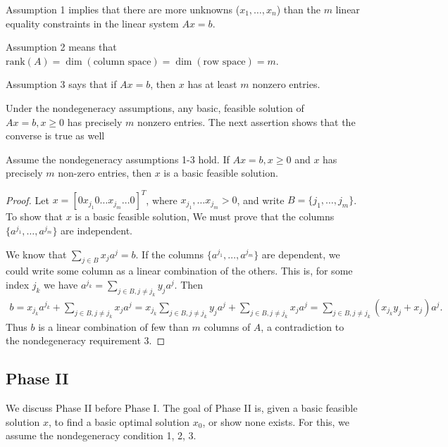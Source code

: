 Assumption 1 implies that there are more unknowns ($x_1, \dots , x_n$) than the $m$ linear equality constraints in the linear system $Ax = b$.

Assumption 2 means that $\mathrm{rank}(A) = \dim (\text{column space}) = \dim (\text{row space}) = m$.

Assumption 3 says that if $Ax = b$, then $x$ has at least $m$ nonzero entries.

\begin{remark}
Under the nondegeneracy assumptions, any basic, feasible solution of $Ax = b, x \ge 0$ has precisely $m$ nonzero entries.
The next assertion shows that the converse is true as well
\end{remark}

\begin{lemma}[On nondegeneracy]
Assume the nondegeneracy assumptions 1-3 hold.
If $Ax = b, x \ge 0$ and $x$ has precisely $m$ non-zero entries, then $x$ is a basic feasible solution.
\end{lemma}

\begin{proof}
Let $x = [0 x_{j_1} 0 \dots x_{j_m} \dots 0]^T$, where $x_{j_1}, \dots x_{j_m} > 0$, and write $B = \{ j_1, \dots, j_m \}$.
To show that $x$ is a basic feasible solution, We must prove that the columns $\{ a^{j_1}, \dots, a^{j_m} \}$ are independent. 

We know that $\sum _{j \in B} x_j a^j = b$.
If the columns $\{ a^{j_1}, \dots, a^{j_m} \}$ are dependent, we could write some column as a linear combination of the others.
This is, for some index $j_k$ we have $a^{j_k} = \sum _ {j \in B, j \neq j_k} y_j a^j$.
Then 
\begin{align}
b = x_{j_k} a^{j_k} + \sum _ {j \in B, j \neq j_k} x_j a^j 
= x_{j_k} \sum _ {j \in B, j \neq j_k} y_j a^j + \sum _ {j \in B, j \neq j_k} x_j a^j 
= \sum _ {j \in B, j \neq j_k} (x_{j_k} y_{j} + x_j) a^j.
\end{align}
Thus $b$ is a linear combination of few than $m$ columns of $A$, a contradiction to the nondegeneracy requirement 3.
\end{proof}

\subsection{Phase II}

We discuss Phase II before Phase I.
The goal of Phase II is, given a basic feasible solution $x$, to find a basic optimal solution $x_0$, or show none exists.
For this, we assume the nondegeneracy condition 1, 2, 3.

